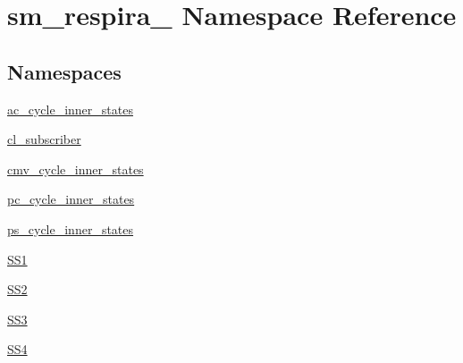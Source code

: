 \hypertarget{namespacesm__respira__1}{}\section{sm\+\_\+respira\+\_ Namespace Reference}
\label{namespacesm__respira__1}
\subsection*{Namespaces}
\begin{DoxyCompactItemize}
\item 
 \hyperlink{namespacesm__respira__1_1_1ac__cycle__inner__states}{ac\+\_\+cycle\+\_\+inner\+\_\+states}
\item 
 \hyperlink{namespacesm__respira__1_1_1cl__subscriber}{cl\+\_\+subscriber}
\item 
 \hyperlink{namespacesm__respira__1_1_1cmv__cycle__inner__states}{cmv\+\_\+cycle\+\_\+inner\+\_\+states}
\item 
 \hyperlink{namespacesm__respira__1_1_1pc__cycle__inner__states}{pc\+\_\+cycle\+\_\+inner\+\_\+states}
\item 
 \hyperlink{namespacesm__respira__1_1_1ps__cycle__inner__states}{ps\+\_\+cycle\+\_\+inner\+\_\+states}
\item 
 \hyperlink{namespacesm__respira__1_1_1SS1}{S\+S1}
\item 
 \hyperlink{namespacesm__respira__1_1_1SS2}{S\+S2}
\item 
 \hyperlink{namespacesm__respira__1_1_1SS3}{S\+S3}
\item 
 \hyperlink{namespacesm__respira__1_1_1SS4}{S\+S4}
\end{DoxyCompactItemize}
